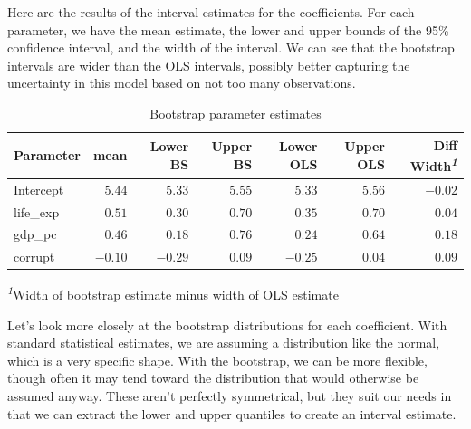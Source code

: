\documentclass[
  letterpaper,
]{krantz}
\begin{document}
Here are the results of the interval estimates for the coefficients. For
each parameter, we have the mean estimate, the lower and upper bounds of
the 95\% confidence interval, and the width of the interval. We can see
that the bootstrap intervals are wider than the OLS intervals, possibly
better capturing the uncertainty in this model based on not too many
observations.

\hypertarget{tbl-bootstrap}{}
\setlength{\LTpost}{0mm}
\begin{longtable}{lrrrrrr}
\caption{\label{tbl-bootstrap}Bootstrap parameter estimates }\tabularnewline

\toprule
Parameter & mean & Lower BS & Upper BS & Lower OLS & Upper OLS & Diff Width\textsuperscript{\textit{1}} \\ 
\midrule\addlinespace[2.5pt]
Intercept & \textcolor[HTML]{404040}{$5.44$} & \textcolor[HTML]{404040}{$5.33$} & \textcolor[HTML]{404040}{$5.55$} & \textcolor[HTML]{404040}{$5.33$} & \textcolor[HTML]{404040}{$5.56$} & \textcolor[HTML]{404040}{$-0.02$} \\ 
life\_exp & \textcolor[HTML]{404040}{$0.51$} & \textcolor[HTML]{404040}{$0.30$} & \textcolor[HTML]{404040}{$0.70$} & \textcolor[HTML]{404040}{$0.35$} & \textcolor[HTML]{404040}{$0.70$} & \textcolor[HTML]{404040}{$0.04$} \\ 
gdp\_pc & \textcolor[HTML]{404040}{$0.46$} & \textcolor[HTML]{404040}{$0.18$} & \textcolor[HTML]{404040}{$0.76$} & \textcolor[HTML]{404040}{$0.24$} & \textcolor[HTML]{404040}{$0.64$} & \textcolor[HTML]{404040}{$0.18$} \\ 
corrupt & \textcolor[HTML]{404040}{$-0.10$} & \textcolor[HTML]{404040}{$-0.29$} & \textcolor[HTML]{404040}{$0.09$} & \textcolor[HTML]{404040}{$-0.25$} & \textcolor[HTML]{404040}{$0.04$} & \textcolor[HTML]{404040}{$0.09$} \\ 
\bottomrule
\end{longtable}
\begin{minipage}{\linewidth}
\textsuperscript{\textit{1}}Width of bootstrap estimate minus width of OLS estimate\\
\end{minipage}

Let's look more closely at the bootstrap distributions for each
coefficient. With standard statistical estimates, we are assuming a
distribution like the normal, which is a very specific shape. With the
bootstrap, we can be more flexible, though often it may tend toward the
distribution that would otherwise be assumed anyway. These aren't
perfectly symmetrical, but they suit our needs in that we can extract
the lower and upper quantiles to create an interval estimate.
\end{document}
